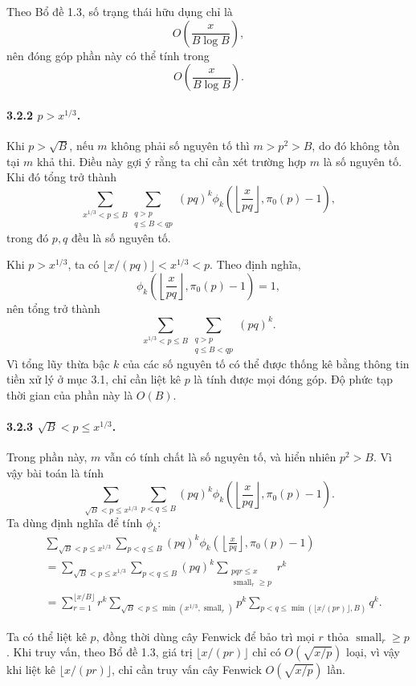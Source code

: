 \documentclass[11pt]{article}
\begin{document}
Theo Bổ đề 1.3, số trạng thái hữu dụng chỉ là
\[
  O\left(\frac{x}{B\log B}\right),
\]
nên đóng góp phần này có thể tính trong
\[
  O\left(\frac{x}{B\log B}\right).
\]

\paragraph{3.2.2 \(p>x^{1/3}\).}
Khi \(p>\sqrt B\), nếu \(m\) không phải số nguyên tố thì \(m>p^2>B\), do đó
không tồn tại \(m\) khả thi. Điều này gợi ý rằng ta chỉ cần xét trường hợp
\(m\) là số nguyên tố. Khi đó tổng trở thành
\[
  \sum_{x^{1/3}<p\le B}
  \sum_{\substack{q>p\\q\le B<qp}}
  (pq)^k\phi_k\left(\left\lfloor\frac{x}{pq}\right\rfloor,\pi_0(p)-1\right),
\]
trong đó \(p,q\) đều là số nguyên tố.

Khi \(p>x^{1/3}\), ta có \(\lfloor x/(pq)\rfloor<x^{1/3}<p\). Theo định nghĩa,
\[
  \phi_k\left(\left\lfloor\frac{x}{pq}\right\rfloor,\pi_0(p)-1\right)=1,
\]
nên tổng trở thành
\[
  \sum_{x^{1/3}<p\le B}
  \sum_{\substack{q>p\\q\le B<qp}}(pq)^k.
\]
Vì tổng lũy thừa bậc \(k\) của các số nguyên tố có thể được thống kê bằng thông
tin tiền xử lý ở mục 3.1, chỉ cần liệt kê \(p\) là tính được mọi đóng góp. Độ
phức tạp thời gian của phần này là \(O(B)\).

\paragraph{3.2.3 \(\sqrt B<p\le x^{1/3}\).}
Trong phần này, \(m\) vẫn có tính chất là số nguyên tố, và hiển nhiên
\(p^2>B\). Vì vậy bài toán là tính
\[
  \sum_{\sqrt B<p\le x^{1/3}}
  \sum_{p<q\le B}
  (pq)^k\phi_k\left(\left\lfloor\frac{x}{pq}\right\rfloor,\pi_0(p)-1\right).
\]
Ta dùng định nghĩa để tính \(\phi_k\):
\[
\begin{aligned}
&\sum_{\sqrt B<p\le x^{1/3}}\sum_{p<q\le B}
(pq)^k\phi_k\left(\left\lfloor\frac{x}{pq}\right\rfloor,\pi_0(p)-1\right)\\
&=\sum_{\sqrt B<p\le x^{1/3}}\sum_{p<q\le B}
(pq)^k
\sum_{\substack{pqr\le x\\\operatorname{small}_r\ge p}}r^k\\
&=\sum_{r=1}^{\lfloor x/B\rfloor}r^k
\sum_{\sqrt B<p\le\min(x^{1/3},\operatorname{small}_r)}
p^k
\sum_{p<q\le\min(\lfloor x/(pr)\rfloor,B)}q^k.
\end{aligned}
\]

Ta có thể liệt kê \(p\), đồng thời dùng cây Fenwick để bảo trì mọi \(r\) thỏa
\(\operatorname{small}_r\ge p\). Khi truy vấn, theo Bổ đề 1.3, giá trị
\(\lfloor x/(pr)\rfloor\) chỉ có \(O(\sqrt{x/p})\) loại, vì vậy khi liệt kê
\(\lfloor x/(pr)\rfloor\), chỉ cần truy vấn cây Fenwick
\(O(\sqrt{x/p})\) lần.
\end{document}
